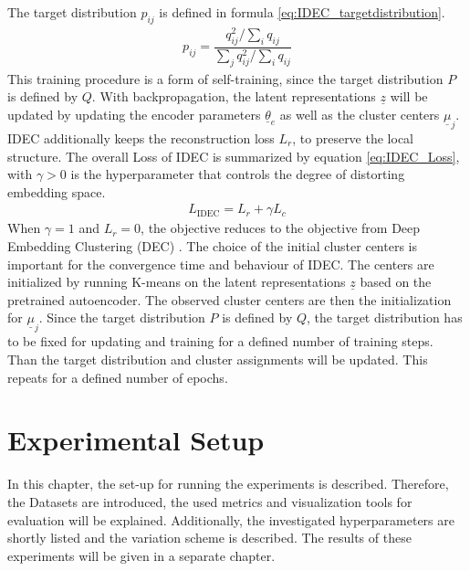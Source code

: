 \documentclass[12pt,DIV14,BCOR12mm,a4paper,footexclude,headinclude,halfparskip-,twoside,openright,cleardoubleempty,idxtotoc,bibtotoc,listtotoc,abstracton]{scrreprt} %
\numberwithin{equation}{chapter}
\begin{document}
The target distribution $p_{ij}$ is defined in formula \ref{eq:IDEC_targetdistribution}.
\begin{align}
	p_{ij}=\dfrac{q_{ij}^{2}/\sum_i q_{ij}}{\sum_j q_{ij}^{2}/\sum_i q_{ij}}\label{eq:IDEC_targetdistribution}
\end{align}
This training procedure is a form of self-training, since the target distribution $P$ is defined by $Q$. With backpropagation, the latent representations $\underline{z}$ will be updated by updating the encoder parameters $\underline{\theta}_e$ as well as the cluster centers $\underline{\mu}_j$. IDEC additionally keeps the reconstruction loss $L_r$, to preserve the local structure. The overall Loss of IDEC is summarized by equation \ref{eq:IDEC_Loss}, with $\gamma > 0 $ is the hyperparameter that controls the degree of distorting embedding space.
\begin{align}
	L_{\textrm{IDEC}} = L_{r} + \gamma L_c\label{eq:IDEC_Loss}
\end{align}
When $\gamma = 1$ and $L_r = 0 $, the objective reduces to the objective from Deep Embedding Clustering (DEC) \cite{Xie16DEC}. The choice of the initial cluster centers is important for the convergence time and behaviour of IDEC. The centers are initialized by running K-means on the latent representations $\underline{z}$ based on the pretrained autoencoder. The observed cluster centers are then the initialization for $\underline{\mu}_j$. Since the target distribution $P$ is defined by $Q$, the target distribution has to be fixed for updating and training for a defined number of training steps. Than the target distribution and cluster assignments will be updated. This repeats for a defined number of epochs.
\chapter{Experimental Setup}
In this chapter, the set-up for running the experiments is described. Therefore, the Datasets are introduced, the used metrics and visualization tools for evaluation will be explained. Additionally, the investigated hyperparameters are shortly listed and the variation scheme is described. The results of these experiments will be given in a separate chapter.
\end{document}
